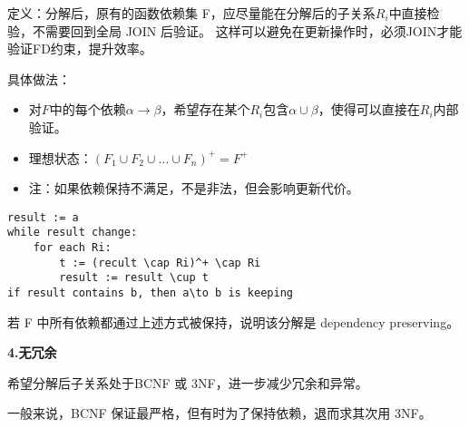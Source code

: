定义：分解后，原有的函数依赖集 F，应尽量能在分解后的子关系$R_i$中直接检验，不需要回到全局 JOIN 后验证。
这样可以避免在更新操作时，必须JOIN才能验证FD约束，提升效率。

具体做法：
\begin{itemize}
    \item 对$F$中的每个依赖$\alpha\to\beta$，希望存在某个$R_i$包含$\alpha\cup\beta$，使得可以直接在$R_i$内部验证。
    \item 理想状态：$(F_1\cup F_2\cup...\cup F_n)^+=F^+$
    \item 注：如果依赖保持不满足，不是非法，但会影响更新代价。
\end{itemize}

\begin{lstlisting}[style=cppstyle]
result := a
while result change:
    for each Ri:
        t := (recult \cap Ri)^+ \cap Ri 
        result := result \cup t
if result contains b, then a\to b is keeping    
\end{lstlisting}

若 F 中所有依赖都通过上述方式被保持，说明该分解是 dependency preserving。

\noindent\textbf{4.无冗余}

希望分解后子关系处于BCNF 或 3NF，进一步减少冗余和异常。

一般来说，BCNF 保证最严格，但有时为了保持依赖，退而求其次用 3NF。